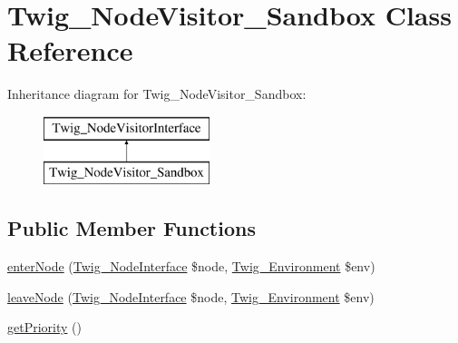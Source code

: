 \hypertarget{class_twig___node_visitor___sandbox}{}\section{Twig\+\_\+\+Node\+Visitor\+\_\+\+Sandbox Class Reference}
\label{class_twig___node_visitor___sandbox}
Inheritance diagram for Twig\+\_\+\+Node\+Visitor\+\_\+\+Sandbox\+:\begin{figure}[H]
\begin{center}
\leavevmode
\includegraphics[height=2.000000cm]{class_twig___node_visitor___sandbox}
\end{center}
\end{figure}
\subsection*{Public Member Functions}
\begin{DoxyCompactItemize}
\item 
\hyperlink{class_twig___node_visitor___sandbox_ad3bfee38f2bc56df9500da7f20b6e13a}{enter\+Node} (\hyperlink{interface_twig___node_interface}{Twig\+\_\+\+Node\+Interface} \$node, \hyperlink{class_twig___environment}{Twig\+\_\+\+Environment} \$env)
\item 
\hyperlink{class_twig___node_visitor___sandbox_a436bb1ae16511148e860e5cfa2cad88f}{leave\+Node} (\hyperlink{interface_twig___node_interface}{Twig\+\_\+\+Node\+Interface} \$node, \hyperlink{class_twig___environment}{Twig\+\_\+\+Environment} \$env)
\item 
\hyperlink{class_twig___node_visitor___sandbox_a1e7a3c168dcd0901a0d2669c67575b55}{get\+Priority} ()
\end{DoxyCompactItemize}
